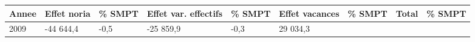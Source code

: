 \begin{longtable}[]{@{}lllllllll@{}}
\toprule
\begin{minipage}[b]{0.05\columnwidth}\raggedright
Annee\strut
\end{minipage} & \begin{minipage}[b]{0.10\columnwidth}\raggedright
Effet noria\strut
\end{minipage} & \begin{minipage}[b]{0.06\columnwidth}\raggedright
\% SMPT\strut
\end{minipage} & \begin{minipage}[b]{0.16\columnwidth}\raggedright
Effet var. effectifs\strut
\end{minipage} & \begin{minipage}[b]{0.06\columnwidth}\raggedright
\% SMPT\strut
\end{minipage} & \begin{minipage}[b]{0.12\columnwidth}\raggedright
Effet vacances\strut
\end{minipage} & \begin{minipage}[b]{0.06\columnwidth}\raggedright
\% SMPT\strut
\end{minipage} & \begin{minipage}[b]{0.09\columnwidth}\raggedright
Total\strut
\end{minipage} & \begin{minipage}[b]{0.06\columnwidth}\raggedright
\% SMPT\strut
\end{minipage}\tabularnewline
\midrule
\endhead
\begin{minipage}[t]{0.05\columnwidth}\raggedright
2009\strut
\end{minipage} & \begin{minipage}[t]{0.10\columnwidth}\raggedright
-44 644,4\strut
\end{minipage} & \begin{minipage}[t]{0.06\columnwidth}\raggedright
-0,5\strut
\end{minipage} & \begin{minipage}[t]{0.16\columnwidth}\raggedright
-25 859,9\strut
\end{minipage} & \begin{minipage}[t]{0.06\columnwidth}\raggedright
-0,3\strut
\end{minipage} & \begin{minipage}[t]{0.12\columnwidth}\raggedright
29 034,3\strut
\end{minipage} & \begin{minipage}[t]{0.06\columnwidth}\raggedright

\end{minipage}
\end{longtable}
